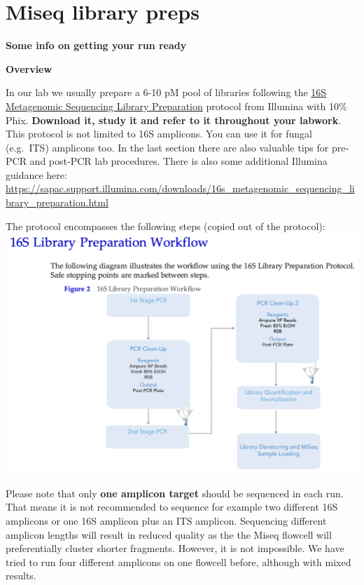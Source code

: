 \documentclass[
]{book}
\begin{document}
\hypertarget{miseq-library-preps}{%
\chapter{Miseq library preps}\label{miseq-library-preps}}

\textbf{Some info on getting your run ready}

\textbf{Overview}

In our lab we usually prepare a 6-10 pM pool of libraries following the \href{https://sapac.support.illumina.com/content/dam/illumina-support/documents/documentation/chemistry_documentation/16s/16s-metagenomic-library-prep-guide-15044223-b.pdf}{16S Metagenomic Sequencing Library
Preparation} protocol from Illumina with 10\% Phix. \textbf{Download it, study it and refer to it throughout your labwork}. This protocol is not limited to 16S amplicons. You can use it for fungal (e.g.~ITS) amplicons too. In the last section there are also valuable tips for pre‐PCR and post‐PCR lab procedures. There is also some additional Illumina guidance here: \url{https://sapac.support.illumina.com/downloads/16s_metagenomic_sequencing_library_preparation.html}

The protocol encompasses the following steps (copied out of the protocol):
\includegraphics{./img/16Slibraryprotocolworkflow.png}

Please note that only \textbf{one amplicon target} should be sequenced in each run. That means it is not recommended to sequence for example two different 16S amplicons or one 16S amplicon plus an ITS amplicon. Sequencing different amplicon lengths will result in reduced quality as the the Miseq flowcell will preferentially cluster shorter fragments. However, it is not impossible. We have tried to run four different amplicons on one flowcell before, although with mixed results.
\end{document}
